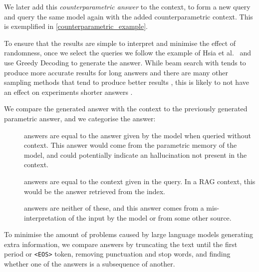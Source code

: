 We later add this \emph{counterparametric answer} to the context, to form a new query and query the same model again with the added counterparametric context.
This is exemplified in \cref{counterparametric_example}.

To ensure that the results are simple to interpret and minimise the effect of randomness, once we select the queries we follow the example of Hsia et al.\ \cite{ragged} and use Greedy Decoding to generate the answer.
While beam search with tends to produce more accurate results for long answers \cite{sutskever_seq2seqlearning,wu_mltranslation} and there are many other sampling methods that tend to produce better results \cite{text_degeneration}, this is likely to not have an effect on experiments shorter answers \cite{t5}.

We compare the generated answer with the context to the previously generated parametric answer, and we categorise the answer:
\begin{description}
	\item[\Parametric{}] answers are equal to the answer given by the model when queried without context.
		This answer would come from the parametric memory of the model, and could potentially indicate an hallucination not present in the context.
	\item[\Contextual{}] answers are equal to the context given in the query.
		In a RAG context, this would be the answer retrieved from the index.
	\item[\Other] answers are neither of these, and this answer comes from a mis-interpretation of the input by the model or from some other source.
\end{description}

To minimise the amount of problems caused by large language models generating extra information, we compare answers by truncating the text until the first period or \texttt{<EOS>} token, removing punctuation and stop words, and finding whether one of the answers is a subsequence of another.
